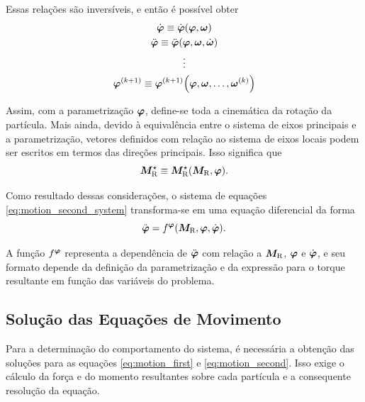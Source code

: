 Essas relações são inversíveis, e então é possível obter
\begin{gather*}
	\deriv{1}{\orientation} \equiv \deriv{1}{\orientation}\pqty{\orientation, \angularVelocity} \\
	\deriv{2}{\orientation} \equiv \deriv{2}{\orientation}\pqty{\orientation, \angularVelocity, \deriv{1}{\angularVelocity}} \\
	\vdots \\
	\deriv{\taylorOrder+1}{\orientation} \equiv \deriv{\taylorOrder+1}{\orientation}\pqty{\orientation, \angularVelocity, \dots, \deriv{\taylorOrder}{\angularVelocity}}
\end{gather*}

Assim, com a parametrização \(\bm{\varphi}\), define-se toda a cinemática da rotação da partícula. Mais ainda, devido à equivalência entre o sistema de eixos principais e a parametrização, vetores definidos com relação ao sistema de eixos locais podem ser escritos em termos das direções principais. Isso significa que
\begin{equation*}
	\principal{\resultingTorque} \equiv \principal{\resultingTorque}\pqty{\resultingTorque, \orientation}.
\end{equation*}

Como resultado dessas considerações, o sistema de equações \eqref{eq:motion_second_system} transforma-se em uma equação diferencial da forma
\begin{equation} \label{eq:diff_equation_orientation_parametrization}
	\deriv{2}{\orientation} = \eqFor{\orientation}\pqty{\resultingTorque, \orientation, \deriv{1}{\orientation}}.
\end{equation}

A função \(f^{\bm{\varphi}}\) representa a dependência de \(\deriv{2}{\orientation}\) com relação a \(\bm{M}_{\text{R}}\), \(\bm{\varphi}\) e \(\deriv{1}{\orientation}\), e seu formato depende da definição da parametrização e da expressão para o torque resultante em função das variáveis do problema.

\subsection{Solução das Equações de Movimento} \label{subsec:motion_equations_solution}

Para a determinação do comportamento do sistema, é necessária a obtenção das soluções para as equações \eqref{eq:motion_first} e \eqref{eq:motion_second}. Isso exige  o cálculo da força e do momento resultantes sobre cada partícula e a consequente resolução da equação. 

